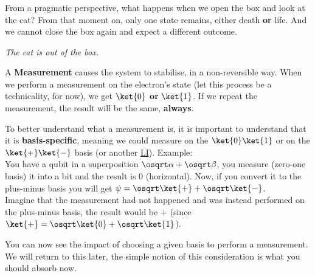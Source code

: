 \documentclass[aspectratio=43]{beamer}
\begin{document}
\subsubsection{\qmt}
\begin{frame}{\qmt}
    \begin{cardTiny}
        From a pragmatic perspective, what happens when we open the box and look at the cat? From that moment on, only one state remains, either death \textbf{or} life. And we cannot close the box again and expect a different outcome.
    \end{cardTiny}
    \begin{cardTiny}
        \centering\textit{The cat is out of the box.}
    \end{cardTiny}
    \begin{cardTiny}
        A \textbf{Measurement} causes the system to stabilise, in a non-reversible way. When we perform a measurement  on the electron's state (let this process be a technicality, for now), we get $\ket{0}$ \textbf{or} $\ket{1}$. If we repeat the measurement, the result will be the same, \textbf{always}. 
    \end{cardTiny}
\pagenumber
\end{frame}

\begin{frame}{\qmt}
\begin{cardTiny}
\small{
    To better understand what a measurement is, it is important to understand that it is \textbf{basis-specific}, meaning we could measure on the $\ket{0}\ket{1}$ or on the $\ket{+}\ket{-}$ basis (or another \href{http://mathworld.wolfram.com/LinearlyIndependent.html}{LI}). Example:\\
    You have a qubit in a superposition $\osqrt\alpha+\osqrt\beta$, you measure (zero-one basis) it into a bit and the result is 0 (horizontal). Now, if you convert it to the plus-minus basis you will get $\psi = \osqrt\ket{+} + \osqrt\ket{-}$.\\
    Imagine that the measurement had not happened and was instead performed on the plus-minus basis, the result would be $+$ (since $\ket{+}=\osqrt\ket{0}+\osqrt\ket{1}$).
}
\end{cardTiny}
\begin{cardTiny}
    \small{You can now see the impact of choosing a given basis to perform a measurement. We will return to this later, the simple notion of this consideration is what you should absorb now.}
\end{cardTiny}
\pagenumber
\end{frame}
\end{document}
